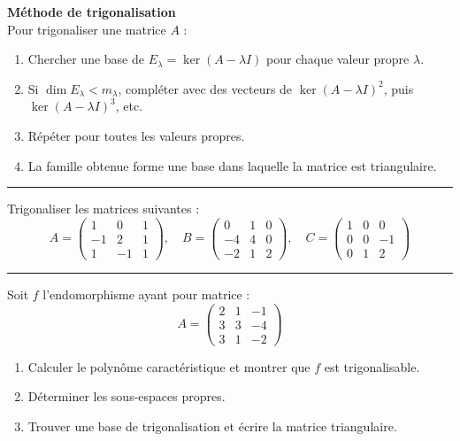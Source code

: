 \documentclass[../PolyS4.tex]{subfiles}
\begin{document}
\begin{Meth}\textbf{Méthode de trigonalisation}\\

Pour trigonaliser une matrice $A$ :
\begin{enumerate}
    \item Chercher une base de $E_\lambda = \ker(A - \lambda I)$ pour chaque valeur propre $\lambda$.
    \item Si $\dim E_\lambda < m_\lambda$, compléter avec des vecteurs de $\ker(A - \lambda I)^2$, puis $\ker(A - \lambda I)^3$, etc.
    \item Répéter pour toutes les valeurs propres.
    \item La famille obtenue forme une base dans laquelle la matrice est triangulaire.
\end{enumerate}
\end{Meth}

\vspace{1em}
\hrule
\vspace{1em}


Trigonaliser les matrices suivantes :
$$A = \begin{pmatrix}
1 & 0 & 1 \\
-1 & 2 & 1 \\
1 & -1 & 1
\end{pmatrix}, \quad
B = \begin{pmatrix}
0 & 1 & 0 \\
-4 & 4 & 0 \\
-2 & 1 & 2
\end{pmatrix}, \quad
C = \begin{pmatrix}
1 & 0 & 0 \\
0 & 0 & -1 \\
0 & 1 & 2
\end{pmatrix}$$

\vspace{1em}
\hrule
\vspace{1em}


Soit $f$ l'endomorphisme ayant pour matrice :
$$A = \begin{pmatrix}
2 & 1 & -1 \\
3 & 3 & -4 \\
3 & 1 & -2
\end{pmatrix}$$
\begin{enumerate}
    \item Calculer le polynôme caractéristique et montrer que $f$ est trigonalisable.
    \item Déterminer les sous-espaces propres.
    \item Trouver une base de trigonalisation et écrire la matrice triangulaire.
\end{enumerate}
\end{document}
